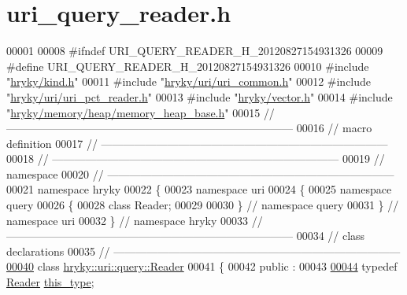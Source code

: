 \hypertarget{uri__query__reader_8h_source}{\section{uri\-\_\-query\-\_\-reader.\-h}
}

\begin{DoxyCode}
00001 
00008 \textcolor{preprocessor}{#ifndef URI\_QUERY\_READER\_H\_20120827154931326}
00009 \textcolor{preprocessor}{}\textcolor{preprocessor}{#define URI\_QUERY\_READER\_H\_20120827154931326}
00010 \textcolor{preprocessor}{}\textcolor{preprocessor}{#include "\hyperlink{kind_8h}{hryky/kind.h}"}
00011 \textcolor{preprocessor}{#include "\hyperlink{uri__common_8h}{hryky/uri/uri_common.h}"}
00012 \textcolor{preprocessor}{#include "\hyperlink{uri__pct__reader_8h}{hryky/uri/uri_pct_reader.h}"}
00013 \textcolor{preprocessor}{#include "\hyperlink{vector_8h}{hryky/vector.h}"}
00014 \textcolor{preprocessor}{#include "\hyperlink{memory__heap__base_8h}{hryky/memory/heap/memory_heap_base.h}"}
00015 \textcolor{comment}{//
      ------------------------------------------------------------------------------}
00016 \textcolor{comment}{// macro definition}
00017 \textcolor{comment}{//
      ------------------------------------------------------------------------------}
00018 \textcolor{comment}{//
      ------------------------------------------------------------------------------}
00019 \textcolor{comment}{// namespace}
00020 \textcolor{comment}{//
      ------------------------------------------------------------------------------}
00021 \textcolor{keyword}{namespace }hryky
00022 \{
00023 \textcolor{keyword}{namespace }uri
00024 \{
00025 \textcolor{keyword}{namespace }query
00026 \{
00028     \textcolor{keyword}{class }Reader;
00029 
00030 \} \textcolor{comment}{// namespace query}
00031 \} \textcolor{comment}{// namespace uri}
00032 \} \textcolor{comment}{// namespace hryky}
00033 \textcolor{comment}{//
      ------------------------------------------------------------------------------}
00034 \textcolor{comment}{// class declarations}
00035 \textcolor{comment}{//
      ------------------------------------------------------------------------------}
\hypertarget{uri__query__reader_8h_source_l00040}{}\hyperlink{classhryky_1_1uri_1_1query_1_1_reader}{00040} \textcolor{comment}{}\textcolor{keyword}{class }\hyperlink{classhryky_1_1uri_1_1query_1_1_reader}{hryky::uri::query::Reader}
00041 \{
00042 \textcolor{keyword}{public} :
00043 
\hypertarget{uri__query__reader_8h_source_l00044}{}\hyperlink{classhryky_1_1uri_1_1query_1_1_reader_a97e540246025546fe1c7f4570b3f7240}{00044}     \textcolor{keyword}{typedef} \hyperlink{classhryky_1_1uri_1_1query_1_1_reader}{Reader} \hyperlink{classhryky_1_1uri_1_1query_1_1_reader_a97e540246025546fe1c7f4570b3f7240}{this_type};

\end{DoxyCode}
